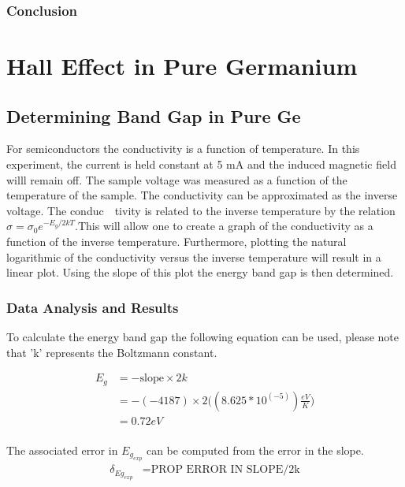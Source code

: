 \documentclass[a4paper]{article}
\begin{document}
\subsubsection{Conclusion}

\newpage

\section{Hall Effect in Pure Germanium}

\subsection{Determining Band Gap in Pure Ge}

\qq For semiconductors the conductivity is a function of
temperature. In this experiment, the current is held constant at 5 mA
and the induced magnetic field willl remain off. The sample voltage
was measured as a function of the temperature of the sample. The
conductivity can be approximated as the inverse voltage. The
conduc\ \ tivity is related to the inverse temperature by the relation
$\sigma = \sigma_0 e^{-E_g/2kT}$.This will allow one to create a graph
of the conductivity as a function of the inverse
temperature. Furthermore, plotting the natural logarithmic of the
conductivity versus the inverse temperature will result in a linear
plot. Using the slope of this plot the energy band gap is then
determined.

\subsubsection{Data Analysis and Results}
\qq To calculate the energy band gap the following equation can be
used, please note that 'k' represents the Boltzmann constant.

\begin{align*}
E_g &= - \text{slope} \times 2k \\
    &= - (-4187) \times 2
       \Big(( 8.625 * 10^(-5)) \frac{eV}{K} \Big) \\
    &= 0.72 eV \\
\end{align*}



The associated error in $E_{g_{exp}}$ can be computed from the error in the slope.
\begin{align*}
\delta_{Eg_{exp}} &= \text{PROP ERROR IN SLOPE/2k} \\
\end{align*}
\end{document}

